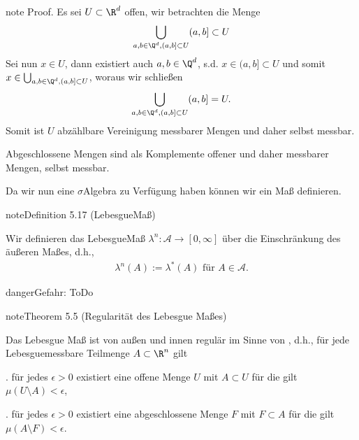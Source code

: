 \documentclass[letterpaper,10pt,german]{jupyterBook}
\begin{document}
\begin{sphinxadmonition}{note}
\sphinxAtStartPar
Proof. Es sei \(U\subset\R^d\) offen, wir betrachten die Menge
\begin{equation*}
\begin{split}\bigcup_{a,b\in \Q^d, (a,b]\subset U} (a,b]\subset U\end{split}
\end{equation*}
\sphinxAtStartPar
Sei nun \(x\in U\), dann existiert auch \(a,b\in\Q^d\), s.d. \(x\in(a,b]\subset U\) und somit \(x\in\bigcup_{a,b\in \Q^d, (a,b]\subset U}\), woraus wir schließen
\begin{equation*}
\begin{split}\bigcup_{a,b\in \Q^d, (a,b]\subset U} (a,b] = U.\end{split}
\end{equation*}
\sphinxAtStartPar
Somit ist \(U\) abzählbare Vereinigung messbarer Mengen und daher selbst messbar.

\sphinxAtStartPar
Abgeschlossene Mengen sind als Komplemente offener und daher messbarer Mengen, selbst messbar.
\end{sphinxadmonition}

\sphinxAtStartPar
Da wir nun eine \(\sigma\)\sphinxhyphen{}Algebra zu Verfügung haben können wir ein Maß definieren.
\label{masstheorie/masstheorie:definition-42}
\begin{sphinxadmonition}{note}{Definition 5.17 (Lebesgue\sphinxhyphen{}Maß)}



\sphinxAtStartPar
Wir definieren das Lebesgue\sphinxhyphen{}Maß \(\lambda^n:\mathcal{A}\to[0,\infty]\) über die Einschränkung des äußeren Maßes, d.h.,
\begin{equation*}
\begin{split}\lambda^n(A):= \lambda^\ast(A)\text{ für } A\in\mathcal{A}.\end{split}
\end{equation*}\end{sphinxadmonition}

\begin{sphinxadmonition}{danger}{Gefahr:}
\sphinxAtStartPar
ToDo
\end{sphinxadmonition}
\label{masstheorie/masstheorie:theorem-43}
\begin{sphinxadmonition}{note}{Theorem 5.5 (Regularität des Lebesgue Maßes)}



\sphinxAtStartPar
Das Lebesgue Maß ist von außen und innen regulär im Sinne von {\hyperref[\detokenize{masstheorie/masstheorie:def:regularitaet}]{}}, d.h., für jede Lebesgue\sphinxhyphen{}messbare Teilmenge \(A \subset \R^n\) gilt

. für jedes \(\epsilon > 0\) existiert eine offene Menge \(U\) mit \(A \subset U\) für die gilt \(\mu(U \setminus A) < \epsilon\),

. für jedes \(\epsilon > 0\) existiert eine abgeschlossene Menge \(F\) mit \(F \subset A\) für die gilt \(\mu(A \setminus F) < \epsilon\).
\end{sphinxadmonition}
\end{document}
